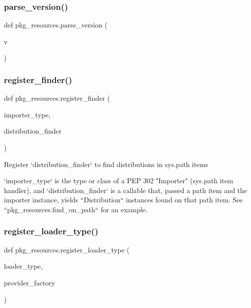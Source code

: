 \subsubsection{\texorpdfstring{parse\+\_\+version()}{parse\_version()}}
{\footnotesize\ttfamily def pkg\+\_\+resources.\+parse\+\_\+version (\begin{DoxyParamCaption}\item[{}]{v }\end{DoxyParamCaption})}

\mbox{\label{namespacepkg__resources_a64bf2dc95891c62e1b8bdfc0d67c21d5}} 
\subsubsection{\texorpdfstring{register\+\_\+finder()}{register\_finder()}}
{\footnotesize\ttfamily def pkg\+\_\+resources.\+register\+\_\+finder (\begin{DoxyParamCaption}\item[{}]{importer\+\_\+type,  }\item[{}]{distribution\+\_\+finder }\end{DoxyParamCaption})}

\begin{DoxyVerb}Register `distribution_finder` to find distributions in sys.path items

`importer_type` is the type or class of a PEP 302 "Importer" (sys.path item
handler), and `distribution_finder` is a callable that, passed a path
item and the importer instance, yields ``Distribution`` instances found on
that path item.  See ``pkg_resources.find_on_path`` for an example.\end{DoxyVerb}
 \mbox{\label{namespacepkg__resources_aebea9035d439bfb9fd4ec75e1c2d2003}} 
\subsubsection{\texorpdfstring{register\+\_\+loader\+\_\+type()}{register\_loader\_type()}}
{\footnotesize\ttfamily def pkg\+\_\+resources.\+register\+\_\+loader\+\_\+type (\begin{DoxyParamCaption}\item[{}]{loader\+\_\+type,  }\item[{}]{provider\+\_\+factory }\end{DoxyParamCaption})}

